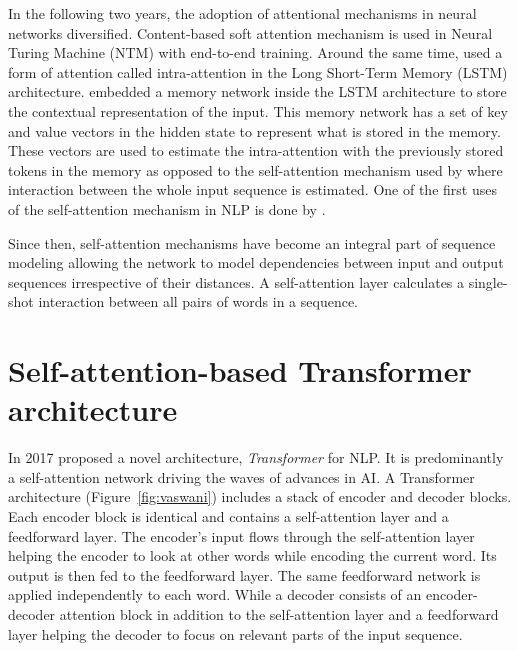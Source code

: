 In the following two years, the adoption of attentional mechanisms in neural networks diversified. Content-based soft attention mechanism \citep{goodfellow2016deep} is used in Neural Turing Machine (NTM) \citep{graves2014neural} with end-to-end training. Around the same time, \citet{cheng2016long} used a form of attention called intra-attention in the Long Short-Term Memory (LSTM) \citep{hochreiter1997long} architecture. \citep{hochreiter1997long} embedded a memory network inside the LSTM architecture to store the contextual representation of the input. This memory network has a set of key and value vectors in the hidden state to represent what is stored in the memory. These vectors are used to estimate the intra-attention with the previously stored tokens in the memory as opposed to the self-attention mechanism used by \citet{vaswani2017attention} where interaction between the whole input sequence is estimated. One of the first uses of the self-attention mechanism in NLP is done by \cite{parikh-etal-2016-decomposable}. 

Since then, self-attention mechanisms have become an integral part of sequence modeling allowing the network to model dependencies between input and output sequences irrespective of their distances. A self-attention layer calculates a single-shot interaction between all pairs of words in a sequence. 

\section{Self-attention-based Transformer architecture}
In 2017 \citet{vaswani2017attention} proposed a novel architecture, \textit{Transformer} for NLP. It is predominantly a self-attention network driving the waves of advances in AI. A Transformer architecture (Figure~\ref{fig:vaswani}) includes a stack of encoder and decoder blocks. Each encoder block is identical and contains a self-attention layer and a feedforward layer. The encoder's input flows through the self-attention layer helping the encoder to look at other words while encoding the current word. Its output is then fed to the feedforward layer. The same feedforward network is applied independently to each word. While a decoder consists of an encoder-decoder attention block in addition to the self-attention layer and a feedforward layer helping the decoder to focus on relevant parts of the input sequence.

